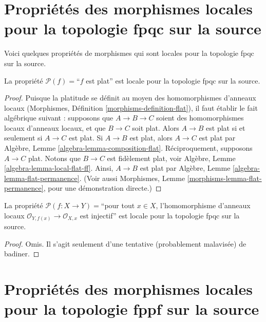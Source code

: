 \section{Propriétés des morphismes locales pour la topologie fpqc sur la source}
\label{section-fpqc-local-source}

\noindent
Voici quelques propriétés de morphismes qui sont locales pour la topologie
fpqc sur la source.

\begin{lemma}
\label{lemma-flat-fpqc-local-source}
La propriété $\mathcal{P}(f)=$``$f$ est plat'' est locale pour la topologie
fpqc sur la source.
\end{lemma}

\begin{proof}
Puisque la platitude se définit au moyen des homomorphismes d'anneaux locaux
(Morphismes, Définition \ref{morphisms-definition-flat}),
il faut établir le fait algébrique suivant : supposons que
$A \to B \to C$ soient des homomorphismes locaux d'anneaux locaux, et que
$B \to C$ soit plat. Alors $A \to B$ est plat si et seulement si
$A \to C$ est plat.
Si $A \to B$ est plat, alors $A \to C$ est plat par
Algèbre, Lemme \ref{algebra-lemma-composition-flat}.
Réciproquement, supposons $A \to C$ plat.
Notons que $B \to C$ est fidèlement plat, voir
Algèbre, Lemme \ref{algebra-lemma-local-flat-ff}.
Ainsi, $A \to B$ est plat par
Algèbre, Lemme \ref{algebra-lemma-flat-permanence}.
(Voir aussi Morphismes, Lemme \ref{morphisms-lemma-flat-permanence},
pour une démonstration directe.)
\end{proof}

\begin{lemma}
\label{lemma-injective-local-rings-fpqc-local-source}
La propriété
$\mathcal{P}(f : X \to Y)=$``pour tout $x \in X$, l'homomorphisme d'anneaux
locaux $\mathcal{O}_{Y, f(x)} \to \mathcal{O}_{X, x}$ est injectif''
est locale pour la topologie fpqc sur la source.
\end{lemma}

\begin{proof}
Omis. Il s'agit seulement d'une tentative (probablement malavisée) de badiner.
\end{proof}





\section{Propriétés des morphismes locales pour la topologie fppf sur la source}
\label{section-fppf-local-source}

